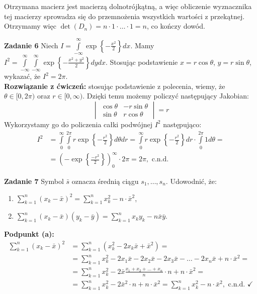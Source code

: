 \documentclass[a4paper,12pt]{article}
\begin{document}
\noindent Otrzymana macierz jest macierzą dolnotrójkątną, a więc obliczenie 
wyznacznika tej macierzy sprowadza się do przemnożenia wszystkich wartości
z przekątnej. Otrzymamy więc $\det(D_n) = n \cdot 1 \cdot \ldots \cdot 1 = n$,
co kończy dowód.

\newpage
\noindent \textbf{Zadanie 6} \newline
Niech $I = \int\limits_{-\infty}^{\infty} \exp \left\{ -\frac{x^2}{2} \right\} dx$.
Mamy $I^2 = \int\limits_{-\infty}^{\infty} \int\limits_{-\infty}^{\infty} \exp 
\left\{ -\frac{x^2 + y^2}{2} \right\} dy dx$. Stosując podstawienie $x = r \cos 
\theta$, $y = r \sin \theta$, wykazać, że $I^2 = 2 \pi$. \\

\noindent \textbf{Rozwiązanie z ćwiczeń:} stosując podstawienie z polecenia,
wiemy, że $\theta \in [0, 2\pi)$ oraz $r \in [0, \infty)$. Dzięki temu możemy
policzyć następujący Jakobian:
\[
    \begin{vmatrix}
        \cos \theta     &   -r \sin \theta \\
        \sin \theta     &   r \cos \theta
    \end{vmatrix} = r   
\]
\noindent Wykorzystamy go do policzenia całki podwójnej $I^2$ następująco:
\begin{align*}
    I^2 &= \int\limits_{0}^{\infty} \int\limits_{0}^{2\pi}
            r \exp \left\{ -\frac{r^2}{2} \right\} d\theta dr =
            \int\limits_{0}^{\infty} r \exp \left\{ -\frac{r^2}{2} \right\} dr
            \cdot \int\limits_{0}^{2\pi} 1 d\theta = \\
        &= \left( -\exp \left\{ \frac{-r^2}{2} \right\} \right)_0^\infty
            \cdot 2\pi = 2\pi, \text{ c.n.d.}
\end{align*}


\noindent \textbf{Zadanie 7} \newline
Symbol $\bar{s}$ oznacza średnią ciągu $s_1, \ldots, s_n$. Udowodnić, że:
\begin{enumerate}[label=(\alph*)]
    \item $\sum\limits_{k=1}^{n} (x_k - \bar{x})^2 = 
           \sum\limits_{k=1}^{n} x_k^2 - n \cdot \bar{x}^2$,
    \item $\sum\limits_{k=1}^{n} (x_k - \bar{x})(y_k - \bar{y}) =
           \sum\limits_{k=1}^{n} x_k y_k - n \bar{x} \bar{y}$.
\end{enumerate}

\noindent \textbf{Podpunkt (a):}
\begin{align*}
    \sum\limits_{k=1}^{n} (x_k - \bar{x})^2 &= 
        \sum\limits_{k=1}^{n} (x_k^2 - 2 x_k \bar{x} + \bar{x}^2) = \\
    &= \sum\limits_{k=1}^{n} x_k^2 - 2 x_1 \bar{x} - 2 x_2 \bar{x}
        - 2 x_3 \bar{x} - \ldots - 2 x_n \bar{x} + n \cdot \bar{x}^2 = \\
    &= \sum\limits_{k=1}^{n} x_k^2 
        - 2 \bar{x} \frac{x_1 + x_2 + \ldots + x_n}{n} \cdot n + n \cdot \bar{x}^2 = \\
    &= \sum\limits_{k=1}^{n} x_k^2 - 2 \bar{x}^2 \cdot n + n \cdot \bar{x}^2 =
        \sum\limits_{k=1}^{n} x_k^2 - n \cdot \bar{x}^2, \text{ c.n.d. } \checkmark
\end{align*}
\end{document}
